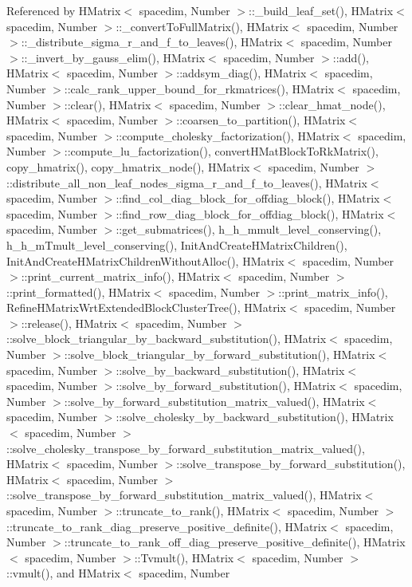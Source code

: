 Referenced by H\+Matrix$<$ spacedim, Number $>$\+::\+\_\+build\+\_\+leaf\+\_\+set(), H\+Matrix$<$ spacedim, Number $>$\+::\+\_\+convert\+To\+Full\+Matrix(), H\+Matrix$<$ spacedim, Number $>$\+::\+\_\+distribute\+\_\+sigma\+\_\+r\+\_\+and\+\_\+f\+\_\+to\+\_\+leaves(), H\+Matrix$<$ spacedim, Number $>$\+::\+\_\+invert\+\_\+by\+\_\+gauss\+\_\+elim(), H\+Matrix$<$ spacedim, Number $>$\+::add(), H\+Matrix$<$ spacedim, Number $>$\+::addsym\+\_\+diag(), H\+Matrix$<$ spacedim, Number $>$\+::calc\+\_\+rank\+\_\+upper\+\_\+bound\+\_\+for\+\_\+rkmatrices(), H\+Matrix$<$ spacedim, Number $>$\+::clear(), H\+Matrix$<$ spacedim, Number $>$\+::clear\+\_\+hmat\+\_\+node(), H\+Matrix$<$ spacedim, Number $>$\+::coarsen\+\_\+to\+\_\+partition(), H\+Matrix$<$ spacedim, Number $>$\+::compute\+\_\+cholesky\+\_\+factorization(), H\+Matrix$<$ spacedim, Number $>$\+::compute\+\_\+lu\+\_\+factorization(), convert\+H\+Mat\+Block\+To\+Rk\+Matrix(), copy\+\_\+hmatrix(), copy\+\_\+hmatrix\+\_\+node(), H\+Matrix$<$ spacedim, Number $>$\+::distribute\+\_\+all\+\_\+non\+\_\+leaf\+\_\+nodes\+\_\+sigma\+\_\+r\+\_\+and\+\_\+f\+\_\+to\+\_\+leaves(), H\+Matrix$<$ spacedim, Number $>$\+::find\+\_\+col\+\_\+diag\+\_\+block\+\_\+for\+\_\+offdiag\+\_\+block(), H\+Matrix$<$ spacedim, Number $>$\+::find\+\_\+row\+\_\+diag\+\_\+block\+\_\+for\+\_\+offdiag\+\_\+block(), H\+Matrix$<$ spacedim, Number $>$\+::get\+\_\+submatrices(), h\+\_\+h\+\_\+mmult\+\_\+level\+\_\+conserving(), h\+\_\+h\+\_\+m\+Tmult\+\_\+level\+\_\+conserving(), Init\+And\+Create\+H\+Matrix\+Children(), Init\+And\+Create\+H\+Matrix\+Children\+Without\+Alloc(), H\+Matrix$<$ spacedim, Number $>$\+::print\+\_\+current\+\_\+matrix\+\_\+info(), H\+Matrix$<$ spacedim, Number $>$\+::print\+\_\+formatted(), H\+Matrix$<$ spacedim, Number $>$\+::print\+\_\+matrix\+\_\+info(), Refine\+H\+Matrix\+Wrt\+Extended\+Block\+Cluster\+Tree(), H\+Matrix$<$ spacedim, Number $>$\+::release(), H\+Matrix$<$ spacedim, Number $>$\+::solve\+\_\+block\+\_\+triangular\+\_\+by\+\_\+backward\+\_\+substitution(), H\+Matrix$<$ spacedim, Number $>$\+::solve\+\_\+block\+\_\+triangular\+\_\+by\+\_\+forward\+\_\+substitution(), H\+Matrix$<$ spacedim, Number $>$\+::solve\+\_\+by\+\_\+backward\+\_\+substitution(), H\+Matrix$<$ spacedim, Number $>$\+::solve\+\_\+by\+\_\+forward\+\_\+substitution(), H\+Matrix$<$ spacedim, Number $>$\+::solve\+\_\+by\+\_\+forward\+\_\+substitution\+\_\+matrix\+\_\+valued(), H\+Matrix$<$ spacedim, Number $>$\+::solve\+\_\+cholesky\+\_\+by\+\_\+backward\+\_\+substitution(), H\+Matrix$<$ spacedim, Number $>$\+::solve\+\_\+cholesky\+\_\+transpose\+\_\+by\+\_\+forward\+\_\+substitution\+\_\+matrix\+\_\+valued(), H\+Matrix$<$ spacedim, Number $>$\+::solve\+\_\+transpose\+\_\+by\+\_\+forward\+\_\+substitution(), H\+Matrix$<$ spacedim, Number $>$\+::solve\+\_\+transpose\+\_\+by\+\_\+forward\+\_\+substitution\+\_\+matrix\+\_\+valued(), H\+Matrix$<$ spacedim, Number $>$\+::truncate\+\_\+to\+\_\+rank(), H\+Matrix$<$ spacedim, Number $>$\+::truncate\+\_\+to\+\_\+rank\+\_\+diag\+\_\+preserve\+\_\+positive\+\_\+definite(), H\+Matrix$<$ spacedim, Number $>$\+::truncate\+\_\+to\+\_\+rank\+\_\+off\+\_\+diag\+\_\+preserve\+\_\+positive\+\_\+definite(), H\+Matrix$<$ spacedim, Number $>$\+::\+Tvmult(), H\+Matrix$<$ spacedim, Number $>$\+::vmult(), and H\+Matrix$<$ spacedim, Number 